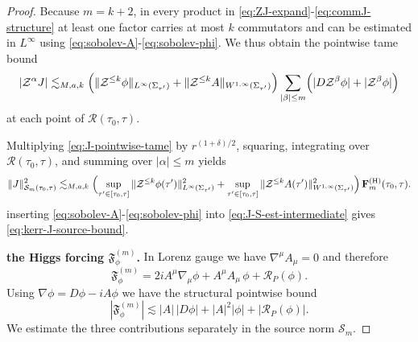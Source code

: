 \documentclass[11pt]{article}
\numberwithin{equation}{section}
\theoremstyle{plain}
\theoremstyle{definition}
\theoremstyle{remark}
\begin{document}
\begin{proof}
Because $m=k+2$, in every product in \eqref{eq:ZJ-expand}-\eqref{eq:commJ-structure} at least one factor carries at most $k$ commutators and can be estimated in $L^\infty$ using \eqref{eq:sobolev-A}-\eqref{eq:sobolev-phi}.
We thus obtain the pointwise tame bound
\begin{equation}\label{eq:J-pointwise-tame}
|\mathcal Z^\alpha J|
\lesssim_{M,a,k}
\Bigl(\|\mathcal Z^{\le k}\phi\|_{L^\infty(\Sigma_{\tau'})}
+\|\mathcal Z^{\le k}A\|_{W^{1,\infty}(\Sigma_{\tau'})}\Bigr)
\sum_{|\beta|\le m}\Bigl(|D\mathcal Z^\beta\phi|+|\mathcal Z^\beta\phi|\Bigr)
\end{equation}
at each point of $\mathcal R(\tau_0,\tau)$.

Multiplying \eqref{eq:J-pointwise-tame} by $r^{(1+\delta)/2}$, squaring, integrating over $\mathcal R(\tau_0,\tau)$, and summing over $|\alpha|\le m$ yields
\begin{equation}\label{eq:J-S-est-intermediate}
\|J\|_{\mathcal S_{m}(\tau_0,\tau)}^{2}
\lesssim_{M,a,k}
\Bigl(
\sup_{\tau'\in[\tau_0,\tau]}\|\mathcal Z^{\le k}\phi(\tau')\|_{L^\infty(\Sigma_{\tau'})}^{2}
+
\sup_{\tau'\in[\tau_0,\tau]}\|\mathcal Z^{\le k}A(\tau')\|_{W^{1,\infty}(\Sigma_{\tau'})}^{2}
\Bigr)\,
\mathbf F_{m}^{(\mathrm H)}(\tau_0,\tau).
\end{equation}
inserting \eqref{eq:sobolev-A}-\eqref{eq:sobolev-phi} into \eqref{eq:J-S-est-intermediate} gives \eqref{eq:kerr-J-source-bound}.

\smallskip\noindent
\textbf{the Higgs forcing $\mathfrak F_\phi^{(m)}$.}
In Lorenz gauge we have $\nabla^\mu A_\mu=0$ and therefore
\begin{equation}
\mathfrak F_\phi^{(m)}
=
2iA^\mu\nabla_\mu\phi
+A^\mu A_\mu\,\phi
+\mathcal R_P(\phi).
\end{equation}
Using $\nabla\phi=D\phi-iA\phi$ we have the structural pointwise bound
\begin{equation}\label{eq:Fphi-structural}
|\mathfrak F_\phi^{(m)}|
\lesssim
|A|\,|D\phi|+|A|^{2}|\phi|+|\mathcal R_P(\phi)|.
\end{equation}
We estimate the three contributions separately in the source norm $\mathcal S_m$.


\end{proof}
\end{document}
